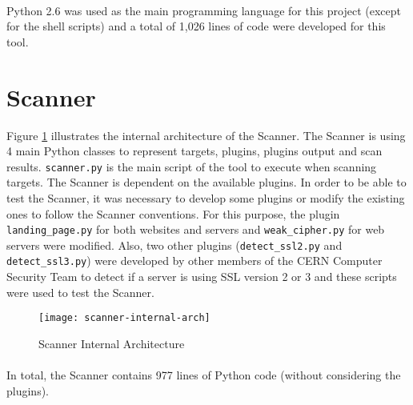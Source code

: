 \paragraph{}
Python 2.6 was used as the main programming language for this project (except for the shell scripts) and a total of 1,026 lines of code were developed for this tool. 
\section{Scanner}
Figure \ref{figure:scanner-internal-arch} illustrates the internal architecture of the Scanner. The Scanner is using 4 main Python classes to represent targets, plugins, plugins output and scan results. \texttt{scanner.py} is the main script of the tool to execute when scanning targets. The Scanner is dependent on the available plugins. In order to be able to test the Scanner, it was necessary to develop some plugins or modify the existing ones to follow the Scanner conventions. For this purpose, the plugin \texttt{landing\_page.py} for both websites and servers and \texttt{weak\_cipher.py} for web servers were modified. Also, two other plugins (\texttt{detect\_ssl2.py} and \texttt{detect\_ssl3.py}) were developed by other members of the CERN Computer Security Team to detect if a server is using SSL version 2 or 3 and these scripts were used to test the Scanner.
\begin{figure}[h!]
  \centering
    \texttt{[image: scanner-internal-arch]}
  \caption{Scanner Internal Architecture}
   \label{figure:scanner-internal-arch}
\end{figure}
\paragraph{}
In total, the Scanner contains 977 lines of Python code (without considering the plugins). 